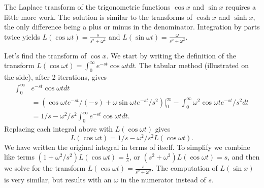 The Laplace transform of the trigonometric functions $\cos x$ and $\sin x$ requires a little more work. The solution is similar to the transforms of $\cosh x$ and $\sinh x$, the only difference being a plus or minus in the denominator. Integration by parts twice yields $L(\cos \omega t) = \frac{s}{s^2+\omega^2}$ and $L(\sin \omega t) = \frac{\omega}{s^2+\omega^2}$.  
\begin{example} 
Let's find the transform of $\cos x$. We start by writing the definition of the transform $L(\cos \omega t) = \int_0^\infty e^{-st}\cos \omega t dt$.  The tabular method (illustrated on the side),
after 2 iterations, gives 
\begin{align*}
\int_0^\infty &e^{-st}\cos \omega t dt \\
&= \left(\cos \omega t e^{-st}/(-s) +\omega \sin \omega te^{-st}/s^2\right)\big|_0^\infty - \int_0^\infty \omega^2 \cos \omega te^{-st}/s^2dt \\
&= 1/s - \omega^2/s^2 \int_0^\infty e^{-st}\cos \omega t dt.
\end{align*}
Replacing each integral above with $L(\cos \omega t)$ gives $$L(\cos \omega t) = 1/s-\omega^2/s^2L(\cos \omega t).$$
We have written the original integral in terms of itself. To simplify we combine like terms $(1+\omega^2/s^2)L(\cos \omega t) = \frac{1}{s}$, or $(s^2+\omega^2) L(\cos \omega t)=s$, and then we solve for the transform $L(\cos \omega t)=\frac{s}{s^2+\omega^2}$. The computation of $L(\sin x)$ is very similar, but results with an $\omega$ in the numerator instead of $s$.
\end{example}

